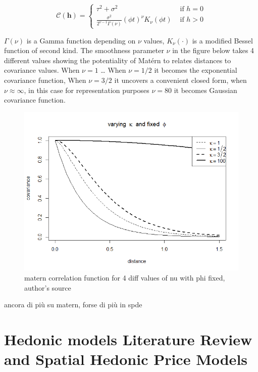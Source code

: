 \documentclass[
  12pt,
  a4paper,
  oneside]{book}
\theoremstyle{definition}
\theoremstyle{definition}
\theoremstyle{definition}
\theoremstyle{remark}
\begin{document}
\[
\mathcal{C}(\mathbf{h})=\left\{\begin{array}{ll}
\tau^{2}+\sigma^{2} & \text { if } h=0 \\
\frac{\sigma^{2}}{2^{\nu-1} \Gamma(\nu)}(\phi t)^{\nu} K_{\nu}(\phi t) & \text { if } h>0
\end{array}\right.
\]

\(\Gamma(\nu)\) is a Gamma function depending on \(\nu\) values, \(K_{\nu}(\cdot)\) is a modified Bessel function of second kind. The smoothness parameter \(\nu\) in the figure below takes 4 different values showing the potentiality of Matérn to relates distances to covariance values. When \(\nu = 1\) \ldots{} When \(\nu = 1/2\) it becomes the exponential covariance function, When \(\nu = 3/2\) it uncovers a convenient closed form, when \(\nu \approx \infty\), in this case for representation purposes \(\nu = 80\) it becomes Gaussian covariance function.

\begin{figure}
\centering
\includegraphics{images/matern.png}
\caption{matern correlation function for 4 diff values of nu with phi fixed, author's source}
\end{figure}

ancora di più su matern, forse di più in spde

\hypertarget{hedonic-models-literature-review-and-spatial-hedonic-price-models}{%
\section{Hedonic models Literature Review and Spatial Hedonic Price Models}\label{hedonic-models-literature-review-and-spatial-hedonic-price-models}}
\end{document}

